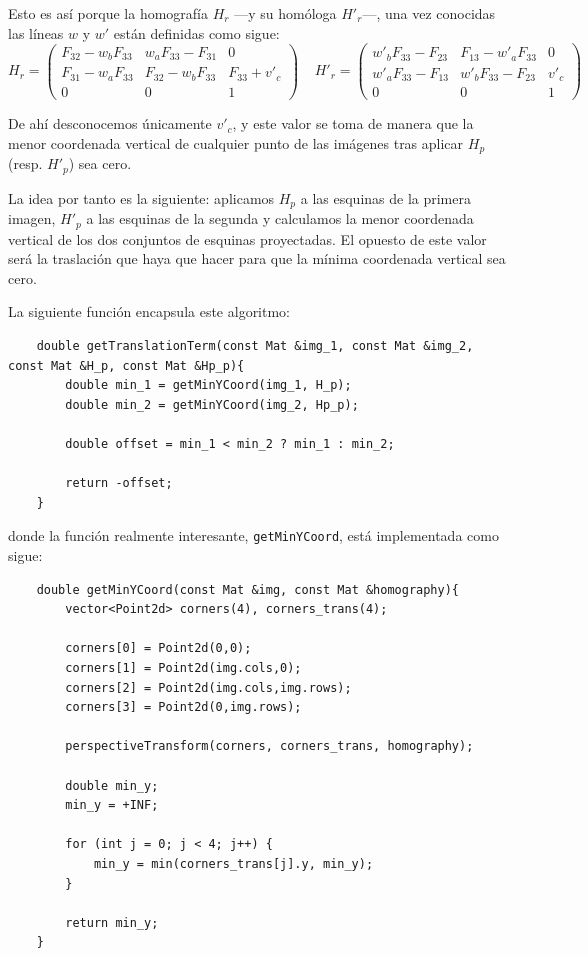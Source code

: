 \documentclass[a4paper, 11pt]{article}
\theoremstyle{definition}
\begin{document}
    Esto es así porque la homografía $H_r$ ---y su homóloga $H'_r$---, una vez conocidas las líneas $w$ y $w'$ están definidas como sigue:
    \[
    H_r = \begin{pmatrix}
        F_{32} - w_b F_{33} & w_a F_{33} - F_{31} & 0 \\
        F_{31} - w_a F_{33} & F_{32} - w_b F_{33} & F_{33} + v'_c \\
        0 & 0 & 1
    \end{pmatrix} \;\;\;\;
    H'_r = \begin{pmatrix}
        w'_b F_{33} - F_{23} & F_{13} - w'_a F_{33} & 0 \\
        w'_a F_{33} - F_{13} & w'_b F_{33} - F_{23} & v'_c \\
        0 & 0 & 1
    \end{pmatrix}
    \]

    De ahí desconocemos únicamente $v'_c$, y este valor se toma de manera que la menor coordenada vertical de cualquier punto de las imágenes tras aplicar $H_p$ (resp. $H'_p$) sea cero.

    La idea por tanto es la siguiente: aplicamos $H_p$ a las esquinas de la primera imagen, $H'_p$ a las esquinas de la segunda y calculamos la menor coordenada vertical de los dos conjuntos de esquinas proyectadas. El opuesto de este valor será la traslación que haya que hacer para que la mínima coordenada vertical sea cero.

    La siguiente función encapsula este algoritmo:
    \begin{lstlisting}
    double getTranslationTerm(const Mat &img_1, const Mat &img_2, const Mat &H_p, const Mat &Hp_p){
        double min_1 = getMinYCoord(img_1, H_p);
        double min_2 = getMinYCoord(img_2, Hp_p);

        double offset = min_1 < min_2 ? min_1 : min_2;

        return -offset;
    }
    \end{lstlisting}
    donde la función realmente interesante, \lstinline{getMinYCoord}, está implementada como sigue:
    \begin{lstlisting}
    double getMinYCoord(const Mat &img, const Mat &homography){
        vector<Point2d> corners(4), corners_trans(4);

        corners[0] = Point2d(0,0);
        corners[1] = Point2d(img.cols,0);
        corners[2] = Point2d(img.cols,img.rows);
        corners[3] = Point2d(0,img.rows);

        perspectiveTransform(corners, corners_trans, homography);

        double min_y;
        min_y = +INF;

        for (int j = 0; j < 4; j++) {
            min_y = min(corners_trans[j].y, min_y);
        }

        return min_y;
    }
    \end{lstlisting}
\end{document}
